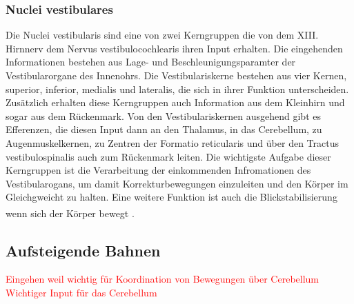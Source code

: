 \documentclass[12pt,a4paper,pdftex]{article}
\begin{document}
\subsubsection*{Nuclei vestibulares} 
Die Nuclei vestibularis sind eine von zwei Kerngruppen die von dem XIII. Hirnnerv dem Nervus vestibulocochlearis ihren Input erhalten. Die eingehenden Informationen bestehen aus Lage- und Beschleunigungsparamter der Vestibularorgane des Innenohrs. Die Vestibulariskerne bestehen aus vier Kernen, superior, inferior, medialis und lateralis, die sich in ihrer Funktion unterscheiden. Zusätzlich erhalten diese Kerngruppen auch Information aus dem Kleinhirn und sogar aus dem Rückenmark. Von den Vestibulariskernen ausgehend gibt es Efferenzen, die diesen Input dann an den Thalamus, in das Cerebellum, zu Augenmuskelkernen, zu Zentren der Formatio reticularis und über den Tractus vestibulospinalis auch zum Rückenmark leiten. Die wichtigste Aufgabe dieser Kerngruppen ist die Verarbeitung der einkommenden Infromationen des Vestibularogans, um damit Korrekturbewegungen einzuleiten und den Körper im Gleichgweicht zu halten. Eine weitere Funktion ist auch die Blickstabilisierung wenn sich der Körper bewegt \textsuperscript{\cite[5]{trepel2011neuroanatomie}}.  


\subsection{Aufsteigende Bahnen}
\textcolor{red}{Eingehen weil wichtig für Koordination von Bewegungen über Cerebellum
Wichtiger Input für das Cerebellum}
\end{document}
